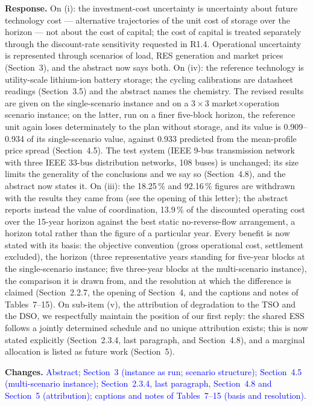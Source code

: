\documentclass[11pt]{article}
\newcommand{\rresponse}[1]{\noindent\textbf{Response.} #1\par\smallskip}
\newcommand{\rchanges}[1]{\noindent\textbf{Changes.} \textcolor{blue}{#1}\par\medskip}
\begin{document}
\rresponse{
On (i): the investment-cost uncertainty is uncertainty about future technology cost --- alternative trajectories of the unit cost of storage over the horizon --- not about the cost of capital; the cost of capital is treated separately through the discount-rate sensitivity requested in R1.4. Operational uncertainty is represented through scenarios of load, RES generation and market prices (Section~3), and
the abstract now says both. 
On (iv): the reference technology is utility-scale lithium-ion battery storage; the cycling calibrations are datasheet readings (Section~3.5) and the abstract names the chemistry. The revised results are given on the single-scenario instance and on a $3\times3$ market$\times$operation scenario instance; 
on the latter, run on a finer five-block horizon, the reference unit again loses determinately to the plan without storage, and its value is 0.909--0.934 of its single-scenario value, against 0.933 predicted from the mean-profile price spread (Section~4.5). The test system (IEEE 9-bus transmission network with three IEEE 33-bus distribution networks, 108 buses) is unchanged; its size
limits the generality of the conclusions and we say so (Section~4.8), and the abstract now states it.
On (iii): the 18.25\,\% and 92.16\,\% figures are withdrawn with the results they came from (see the opening of this letter); the abstract reports instead the value of coordination, 13.9\,\% of the discounted operating cost over the 15-year horizon against the best static no-reverse-flow arrangement, a horizon total rather than the figure of a particular year.
Every benefit is now stated with its basis: the objective convention (gross operational cost, settlement excluded), the horizon (three representative years standing for five-year blocks at the single-scenario instance; five three-year blocks at the multi-scenario instance), the comparison it is drawn from, and the resolution at which the difference is claimed (Section~2.2.7, the opening of Section~4, and the captions and notes of Tables~7--15).
On sub-item (v), the attribution of degradation to the TSO and the DSO, we respectfully maintain the position of our first reply: the shared ESS follows a jointly determined schedule and no unique attribution exists; this is now stated explicitly (Section~2.3.4, last paragraph, and Section~4.8), and a marginal allocation is listed as future work (Section~5).
}

\rchanges{Abstract; Section~3 (instance as run; scenario structure); Section~4.5 (multi-scenario instance);
Section~2.3.4, last paragraph, Section~4.8 and Section~5 (attribution); captions and notes of Tables~7--15 (basis and resolution).}
\end{document}
